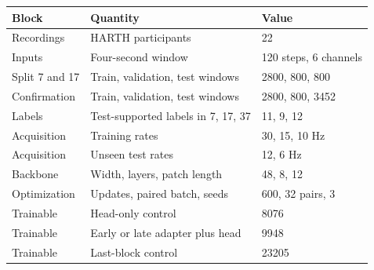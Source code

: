 \begin{tabular}{lll}
\toprule
Block & Quantity & Value \\
\midrule
Recordings & HARTH participants & 22 \\
Inputs & Four-second window & 120 steps, 6 channels \\
Split 7 and 17 & Train, validation, test windows & 2800, 800, 800 \\
Confirmation & Train, validation, test windows & 2800, 800, 3452 \\
Labels & Test-supported labels in 7, 17, 37 & 11, 9, 12 \\
Acquisition & Training rates & 30, 15, 10 Hz \\
Acquisition & Unseen test rates & 12, 6 Hz \\
Backbone & Width, layers, patch length & 48, 8, 12 \\
Optimization & Updates, paired batch, seeds & 600, 32 pairs, 3 \\
Trainable & Head-only control & 8076 \\
Trainable & Early or late adapter plus head & 9948 \\
Trainable & Last-block control & 23205 \\
\bottomrule
\end{tabular}
